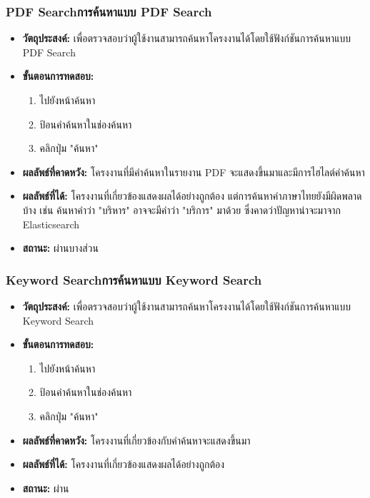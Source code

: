 \subsubsection{\ifenglish PDF Search\else การค้นหาแบบ PDF Search\fi}
\begin{itemize}
  \item \textbf{วัตถุประสงค์:} เพื่อตรวจสอบว่าผู้ใช้งานสามารถค้นหาโครงงานได้โดยใช้ฟังก์ชันการค้นหาแบบ PDF Search
  \item \textbf{ขั้นตอนการทดสอบ:}
  \begin{enumerate}
    \item ไปยังหน้าค้นหา
    \item ป้อนคำค้นหาในช่องค้นหา
    \item คลิกปุ่ม "ค้นหา"
  \end{enumerate}
  \item \textbf{ผลลัพธ์ที่คาดหวัง:} โครงงานที่มีคำค้นหาในรายงาน PDF จะแสดงขึ้นมาและมีการไฮไลต์คำค้นหา
  \item \textbf{ผลลัพธ์ที่ได้:} โครงงานที่เกี่ยวข้องแสดงผลได้อย่างถูกต้อง แต่การค้นหาคำภาษาไทยยังมีผิดพลาดบ้าง เช่น ค้นหาคำว่า "บริหาร" อาจจะมีคำว่า "บริการ" มาด้วย ซึ่งคาดว่าปัญหาน่าจะมาจาก Elasticsearch
  \item \textbf{สถานะ:} ผ่านบางส่วน
\end{itemize}

\subsubsection{\ifenglish Keyword Search\else การค้นหาแบบ Keyword Search\fi}
\begin{itemize}
  \item \textbf{วัตถุประสงค์:} เพื่อตรวจสอบว่าผู้ใช้งานสามารถค้นหาโครงงานได้โดยใช้ฟังก์ชันการค้นหาแบบ Keyword Search
  \item \textbf{ขั้นตอนการทดสอบ:}
  \begin{enumerate}
    \item ไปยังหน้าค้นหา
    \item ป้อนคำค้นหาในช่องค้นหา
    \item คลิกปุ่ม "ค้นหา"
  \end{enumerate}
  \item \textbf{ผลลัพธ์ที่คาดหวัง:} โครงงานที่เกี่ยวข้องกับคำค้นหาจะแสดงขึ้นมา
  \item \textbf{ผลลัพธ์ที่ได้:} โครงงานที่เกี่ยวข้องแสดงผลได้อย่างถูกต้อง
  \item \textbf{สถานะ:} ผ่าน
\end{itemize}
